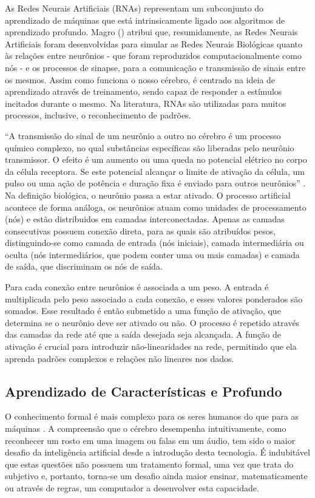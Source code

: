 \documentclass[tcc2]{uftex}
\begin{document}
As Redes Neurais Artificiais (RNAs) representam um subconjunto do aprendizado de máquinas que está intrinsicamente ligado aos algoritmos de aprendizado profundo. Magro (\citeyear{Magro21}) atribui que, resumidamente, as Redes Neurais Artificiais foram desenvolvidas para simular as Redes Neurais Biológicas quanto às relações entre neurônios - que foram reproduzidos computacionalmente como nós - e os processos de sinapse, para a comunicação e transmissão de sinais entre os mesmos. Assim como funciona o nosso cérebro, é centrado na ideia de aprendizado através de treinamento, sendo capaz de responder a estímulos incitados durante o mesmo. Na literatura, RNAs são utilizadas para muitos processos, inclusive, o reconhecimento de padrões.

``A transmissão do sinal de um neurônio a outro no cérebro é um processo químico complexo, no qual substâncias especíﬁcas são liberadas pelo neurônio transmissor. O efeito é um aumento ou uma queda no potencial elétrico no corpo da célula receptora. Se este potencial alcançar o limite de ativação da célula, um pulso ou uma ação de potência e duração ﬁxa é enviado para outros neurônios'' \cite{Barioni17}. Na definição biológica, o neurônio passa a estar ativado. O processo artificial acontece de forma análoga, os neurônios atuam como unidades de processamento (nós) e estão distribuidos em camadas interconectadas. Apenas as camadas consecutivas possuem conexão direta, para as quais são atribuídos pesos, distinguindo-se como camada de entrada (nós iniciais), camada intermediária ou oculta (nós intermediários, que podem conter uma ou mais camadas) e camada de saída, que discriminam os nós de saída.

Para cada conexão entre neurônios é associada a um peso. A entrada é multiplicada pelo peso associado a cada conexão, e esses valores ponderados são somados. Esse resultado é então submetido a uma função de ativação, que determina se o neurônio deve ser ativado ou não. O processo é repetido através das camadas da rede até que a saída desejada seja alcançada. A função de ativação é crucial para introduzir não-linearidades na rede, permitindo que ela aprenda padrões complexos e relações não lineares nos dados.

\subsection{Aprendizado de Características e Profundo}

O conhecimento formal é mais complexo para os seres humanos do que para as máquinas \cite{goodfellow16}. A compreensão que o cérebro desempenha intuitivamente, como reconhecer um rosto em uma imagem ou falas em um áudio, tem sido o maior desafio da inteligência artificial desde a introdução desta tecnologia. É indubitável que estas questões não possuem um tratamento formal, uma vez que trata do subjetivo e, portanto, torna-se um desafio ainda maior ensinar, matematicamente ou através de regras, um computador a desenvolver esta capacidade.
\end{document}
